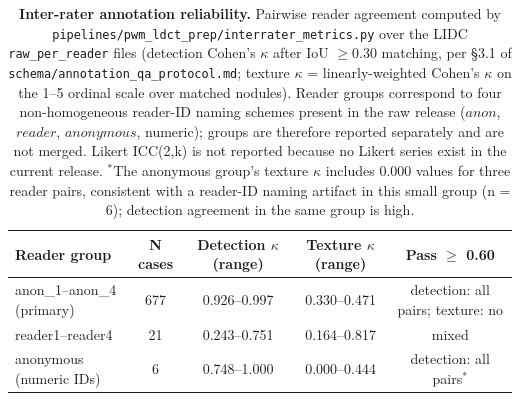 \documentclass[twoside,11pt]{article}
\begin{document}
\begin{table}[ht]
    \centering
    \small
    \setlength{\tabcolsep}{4pt}
    \begin{tabular}{lcccc}
        \toprule
        \textbf{Reader group} & \textbf{N cases} & \textbf{Detection $\kappa$ (range)} & \textbf{Texture $\kappa$ (range)} & \textbf{Pass $\geq$ 0.60} \\
        \midrule
        anon\_1--anon\_4 (primary) & 677 & 0.926--0.997 & 0.330--0.471 & detection: all pairs; texture: no \\
        reader1--reader4          & 21  & 0.243--0.751 & 0.164--0.817 & mixed \\
        anonymous (numeric IDs)   & 6   & 0.748--1.000 & 0.000--0.444 & detection: all pairs$^{*}$ \\
        \bottomrule
    \end{tabular}
    \caption{\textbf{Inter-rater annotation reliability.} Pairwise reader agreement computed by \texttt{pipelines/pwm\_ldct\_prep/interrater\_metrics.py} over the LIDC \texttt{raw\_per\_reader} files (detection Cohen's $\kappa$ after IoU $\geq 0.30$ matching, per \S 3.1 of \texttt{schema/annotation\_qa\_protocol.md}; texture $\kappa$ = linearly-weighted Cohen's $\kappa$ on the 1--5 ordinal scale over matched nodules). Reader groups correspond to four non-homogeneous reader-ID naming schemes present in the raw release ($anon$, $reader$, $anonymous$, numeric); groups are therefore reported separately and are not merged. Likert ICC(2,k) is not reported because no Likert series exist in the current release. $^{*}$The anonymous group's texture $\kappa$ includes 0.000 values for three reader pairs, consistent with a reader-ID naming artifact in this small group (n = 6); detection agreement in the same group is high.}
    \label{tab:irr_v05}
\end{table}
\end{document}
